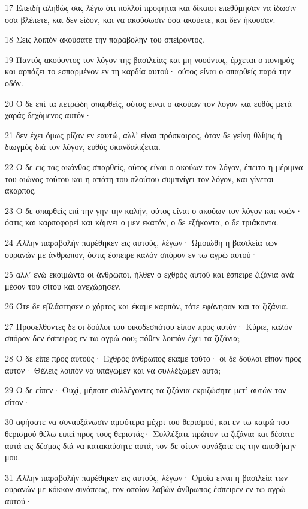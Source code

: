 \par 17 Επειδή αληθώς σας λέγω ότι πολλοί προφήται και δίκαιοι επεθύμησαν να ίδωσιν όσα βλέπετε, και δεν είδον, και να ακούσωσιν όσα ακούετε, και δεν ήκουσαν.
\par 18 Σεις λοιπόν ακούσατε την παραβολήν του σπείροντος.
\par 19 Παντός ακούοντος τον λόγον της βασιλείας και μη νοούντος, έρχεται ο πονηρός και αρπάζει το εσπαρμένον εν τη καρδία αυτού· ούτος είναι ο σπαρθείς παρά την οδόν.
\par 20 Ο δε επί τα πετρώδη σπαρθείς, ούτος είναι ο ακούων τον λόγον και ευθύς μετά χαράς δεχόμενος αυτόν·
\par 21 δεν έχει όμως ρίζαν εν εαυτώ, αλλ' είναι πρόσκαιρος, όταν δε γείνη θλίψις ή διωγμός διά τον λόγον, ευθύς σκανδαλίζεται.
\par 22 Ο δε εις τας ακάνθας σπαρθείς, ούτος είναι ο ακούων τον λόγον, έπειτα η μέριμνα του αιώνος τούτου και η απάτη του πλούτου συμπνίγει τον λόγον, και γίνεται άκαρπος.
\par 23 Ο δε σπαρθείς επί την γην την καλήν, ούτος είναι ο ακούων τον λόγον και νοών· όστις και καρποφορεί και κάμνει ο μεν εκατόν, ο δε εξήκοντα, ο δε τριάκοντα.
\par 24 Άλλην παραβολήν παρέθηκεν εις αυτούς, λέγων· Ωμοιώθη η βασιλεία των ουρανών με άνθρωπον, όστις έσπειρε καλόν σπόρον εν τω αγρώ αυτού·
\par 25 αλλ' ενώ εκοιμώντο οι άνθρωποι, ήλθεν ο εχθρός αυτού και έσπειρε ζιζάνια ανά μέσον του σίτου και ανεχώρησεν.
\par 26 Ότε δε εβλάστησεν ο χόρτος και έκαμε καρπόν, τότε εφάνησαν και τα ζιζάνια.
\par 27 Προσελθόντες δε οι δούλοι του οικοδεσπότου είπον προς αυτόν· Κύριε, καλόν σπόρον δεν έσπειρας εν τω αγρώ σου; πόθεν λοιπόν έχει τα ζιζάνια;
\par 28 Ο δε είπε προς αυτούς· Εχθρός άνθρωπος έκαμε τούτο· οι δε δούλοι είπον προς αυτόν· Θέλεις λοιπόν να υπάγωμεν και να συλλέξωμεν αυτά;
\par 29 Ο δε είπεν· Ουχί, μήποτε συλλέγοντες τα ζιζάνια εκριζώσητε μετ' αυτών τον σίτον·
\par 30 αφήσατε να συναυξάνωσιν αμφότερα μέχρι του θερισμού, και εν τω καιρώ του θερισμού θέλω ειπεί προς τους θεριστάς· Συλλέξατε πρώτον τα ζιζάνια και δέσατε αυτά εις δέσμας διά να κατακαύσητε αυτά, τον δε σίτον συνάξατε εις την αποθήκην μου.
\par 31 Άλλην παραβολήν παρέθηκεν εις αυτούς, λέγων· Ομοία είναι η βασιλεία των ουρανών με κόκκον σινάπεως, τον οποίον λαβών άνθρωπος έσπειρεν εν τω αγρώ αυτού·
